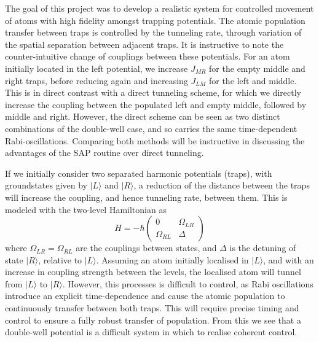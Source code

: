 The goal of this project was to develop a realistic system for controlled movement of atoms with high fidelity amongst trapping potentials. The atomic population transfer between traps is controlled by the tunneling rate, through variation of the spatial separation between adjacent traps. It is instructive to note the counter-intuitive change of couplings between these potentials. For an atom initially located in the left potential, we increase $J_{MR}$ for the empty middle and right traps, before reducing again and increasing $J_{LM}$ for the left and middle. This is in direct contrast with a direct tunneling scheme, for which we directly increase the coupling between the populated left and empty middle, followed by middle and right. However, the direct scheme can be seen as two distinct combinations of the double-well case, and so carries the same time-dependent Rabi-oscillations. Comparing both methods will be instructive in discussing the advantages of the SAP routine over direct tunneling. %

If we initially consider two separated harmonic potentials (traps), with groundstates given by $| L \rangle$ and $| R \rangle$, a reduction of the distance between the traps will increase the coupling, and hence tunneling rate, between them. This is modeled with the two-level Hamiltonian as
\begin{equation}
    H = -\hbar
    \begin{pmatrix}
        0 & \Omega_{LR} \\
        \Omega_{RL} & \Delta
    \end{pmatrix}
\end{equation}
where $\Omega_{LR} = \Omega_{RL}$ are the couplings between states, and $\Delta$ is the detuning of state $| R \rangle$, relative to $| L \rangle$. Assuming an atom initially localised in $| L \rangle$, and with an increase in coupling strength between the levels, the localised atom will tunnel from $| L \rangle$ to $| R \rangle $. However, this processes is difficult to control, as Rabi oscillations introduce an explicit time-dependence and cause the atomic population to continuously transfer between both traps. This will require precise timing and control to ensure a fully robust transfer of population. From this we see that a double-well potential is a difficult system in which to realise coherent control.

